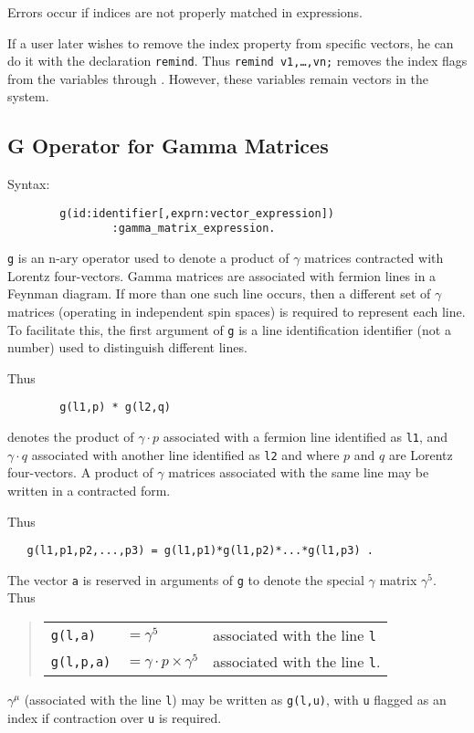 Errors occur if indices are not properly matched in expressions.

\hypertarget{command:REMIND}{}
If a user later wishes to remove the index property from specific vectors,
he can do it with the declaration \texttt{remind}. Thus
\texttt{remind v1,\ldots{},vn;} removes the index flags from the variables
through .  However, these variables remain vectors in the system.

\subsection{G Operator for Gamma Matrices}
\hypertarget{operator:G}{}

Syntax:
\begin{verbatim}
        g(id:identifier[,exprn:vector_expression])
                :gamma_matrix_expression.
\end{verbatim}
\texttt{g} is an n-ary operator used to denote a product of $\gamma$ matrices
contracted with Lorentz four-vectors. Gamma matrices are associated with
fermion lines in a Feynman diagram. If more than one such line occurs,
then a different set of $\gamma$ matrices (operating in independent spin
spaces) is required to represent each line. To facilitate this, the first
argument of \texttt{g} is a line identification identifier (not a number)
used to distinguish different lines.

Thus
\begin{verbatim}
        g(l1,p) * g(l2,q)
\end{verbatim}
denotes the product of $\gamma \cdot p$ associated with a fermion line
identified as \texttt{l1}, and $\gamma \cdot q$ associated with another line
identified as \texttt{l2} and where $p$ and $q$ are Lorentz
four-vectors.  A product of $\gamma$ matrices associated with the same
line may be written in a contracted form.

Thus
\begin{verbatim}
   g(l1,p1,p2,...,p3) = g(l1,p1)*g(l1,p2)*...*g(l1,p3) .
\end{verbatim}
The vector \texttt{a} is reserved in arguments of \texttt{g} to denote the special
$\gamma$ matrix $\gamma^{5}$. Thus
\begin{quote}
\begin{tabular}{lll}
 \texttt{g(l,a)} & $ = \gamma^{5}$ & associated with the line \texttt{l} \\[0.1in]
 \texttt{g(l,p,a)} & $ = \gamma\cdot p \times \gamma^{5}$ &
           associated with the line \texttt{l}.
\end{tabular}
\end{quote}
$\gamma^{\mu}$ (associated with the line \texttt{l}) may be written as
\texttt{g(l,u)}, with \texttt{u} flagged as an index if contraction over \texttt{u}
is required.

